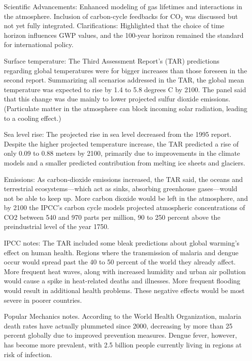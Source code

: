 \documentclass{tufte-handout}\usepackage[]{graphicx}\usepackage[]{xcolor}
\begin{document}
Scientific Advancements:
Enhanced modeling of gas lifetimes and interactions in the atmosphere.
Inclusion of carbon-cycle feedbacks for CO₂ was discussed but not yet fully integrated.
Clarifications: Highlighted that the choice of time horizon influences GWP values, and the 100-year horizon remained the standard for international policy.


Surface temperature: The Third Assessment Report's (TAR) predictions regarding global temperatures were for bigger increases than those foreseen in the second report. Summarizing all scenarios addressed in the TAR, the global mean temperature was expected to rise by 1.4 to 5.8 degrees C by 2100. The panel said that this change was due mainly to lower projected sulfur dioxide emissions. (Particulate matter in the atmosphere can block incoming solar radiation, leading to a cooling effect.)

Sea level rise: The projected rise in sea level decreased from the 1995 report. Despite the higher projected temperature increase, the TAR predicted a rise of only 0.09 to 0.88 meters by 2100, primarily due to improvements in the climate models and a smaller predicted contribution from melting ice sheets and glaciers.

Emissions: As carbon-dioxide emissions increased, the TAR said, the oceans and terrestrial ecosystems—which act as sinks, absorbing greenhouse gases—would not be able to keep up. More carbon dioxide would be left in the atmosphere, and by 2100 the IPCC's carbon cycle models projected atmospheric concentrations of CO2 between 540 and 970 parts per million, 90 to 250 percent above the preindustrial level of the year 1750.

IPCC notes: The TAR included some bleak predictions about global warming's effect on human health. Regions where the transmission of malaria and dengue occur would spread past the 40 to 50 percent of the world they already affect. More frequent heat waves, along with increased humidity and urban air pollution would cause a spike in heat-related deaths and illnesses. More frequent flooding would result in additional health problems. These negative effects would be most severe in poorer countries.

Popular Mechanics notes. According to the World Health Organization, malaria death rates have actually plummeted since 2000, decreasing by more than 25 percent globally due to improved prevention measures. Dengue fever, however, has become more prevalent, with 2.5 billion people currently living in regions at risk of infection.
\end{document}
